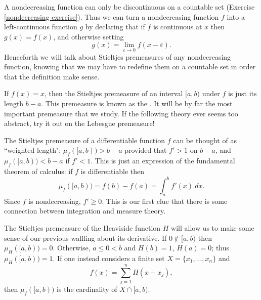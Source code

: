 \begin{subsec}
A nondecreasing function can only be discontinuous on a countable set (Exercise \ref{nondecreasing exercise}).
Thus we can turn a nondecreasing function $f$ into a left-continuous function $g$ by declaring that if $f$ is continuous at $x$ then $g(x) = f(x)$, and otherwise setting
\[g(x) = \lim_{\varepsilon \to 0} f(x - \varepsilon).\]
Henceforth we will talk about Stieltjes premeasures of any nondecreasing function, knowing that we may have to redefine them on a countable set in order that the definition make sense.
\end{subsec}

\begin{example}
If $f(x) = x$, then the Stieltjes premeasure of an interval $[a, b)$ under $f$ is just its length $b - a$.
This premeasure is known as the .
It will be by far the most important premeasure that we study.
If the following theory ever seems too abstract, try it out on the Lebesgue premeasure!
\end{example}

\begin{example}
The Stieltjes premeasure of a differentiable function $f$ can be thought of as ``weighted length"; $\mu_f([a, b)) > b - a$ provided that $f' > 1$ on $b - a$, and $\mu_f([a, b)) < b - a$ if $f' < 1$.
This is just an expression of the fundamental theorem of calculus: if $f$ is differentiable then
\[\mu_f([a, b)) = f(b) - f(a) = \int_a^b f'(x)~dx.\]
Since $f$ is nondecreasing, $f' \geq 0$.
This is our first clue that there is some connection between integration and measure theory.
\end{example}

\begin{example}
The Stieltjes premeasure of the Heaviside function $H$ will allow us to make some sense of our previous waffling about its derivative.
If $0 \notin [a, b)$ then $\mu_H([a, b)) = 0$.
Otherwise, $a \leq 0 < b$ and $H(b) = 1$, $H(a) = 0$; thus $\mu_H([a, b)) = 1$.
If one instead considers a finite set $X = \{x_1, \dots, x_n\}$ and
\[f(x) = \sum_{j=1}^n H(x - x_j),\]
then $\mu_f([a, b))$ is the cardinality of $X \cap [a, b)$.
\end{example}

